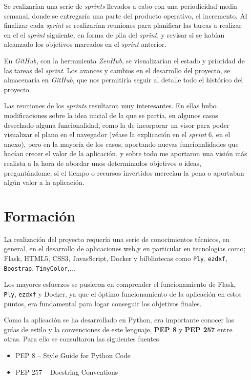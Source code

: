 Se realizarían una serie de \emph{sprints} llevados a cabo con una periodicidad media semanal, donde se entregaría una parte del producto operativo, el incremento. Al finalizar cada \emph{sprint} se realizarían reuniones para planificar las tareas a realizar en el el \emph{sprint} siguiente, en forma de pila del \emph{sprint}, y revisar si se habían alcanzado los objetivos marcados en el \emph{sprint} anterior.

En \emph{GitHub}, con la herramienta \emph{ZenHub}, se visualizarían el estado y prioridad de las tareas del \emph{sprint}. Los avances y cambios en el desarrollo del proyecto, se almacenaría en \emph{GitHub}, que nos permitiría seguir al detalle  todo el histórico del proyecto.

Las reuniones de los \emph{sprints} resultaron muy interesantes. En ellas hubo modificaciones sobre la idea inicial de la que se partía, en algunos casos desechado alguna funcionalidad, como la de incorporar un visor para poder visualizar el plano en el navegador (véase la explicación en el \emph{sprint} 6, en el anexo), pero en la mayoría de los casos, aportando nuevas funcionalidades que hacían  crecer el valor de la aplicación, y sobre todo me aportaron una visión más realista a la hora de abordar unos determinados objetivos o ideas, preguntándome, si el tiempo o recursos invertidos merecían la pena o aportaban algún valor a la aplicación.

\section{Formación}

La realización del proyecto requería una serie de conocimientos técnicos, en general, en el desarrollo de aplicaciones web,y en particular en  tecnologías como;
Flask, HTML5, CSS3, JavasScript, Docker y bilbliotecas como \texttt{Ply}, \texttt{ezdxf}, \texttt{Boostrap}, \texttt{TinyColor},...

Los mayores esfuerzos se pusieron en comprender el funcionamiento de Flask, \texttt{Ply}, \texttt{ezdxf} y Docker, ya que el óptimo funcionamiento de la aplicación  en estos puntos, era fundamental para logar conseguir los objetivos finales. 

Como la aplicación se ha desarrollado en Python, era importante conocer las guías de estilo y la convenciones de este lenguaje, \textbf{PEP 8} y \textbf{PEP 257} entre otras. Para ello se consultaron las siguientes fuentes:

\begin{itemize}
\item PEP 8 -- Style Guide for Python Code \cite{PEP8}
\item PEP 257 -- Docstring Conventions \cite{PEP257}
\end{itemize}



